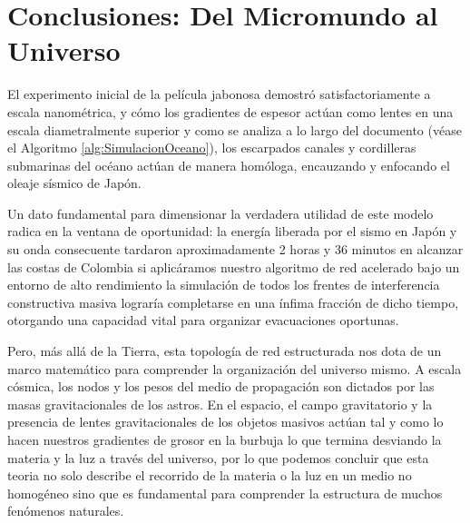 \section{Conclusiones: Del Micromundo al Universo}
El experimento inicial de la película jabonosa demostró satisfactoriamente a escala nanométrica, y cómo los gradientes de espesor actúan como lentes en una escala diametralmente superior y como se analiza a lo largo del documento (véase el Algoritmo \ref{alg:SimulacionOceano}), los escarpados canales y cordilleras submarinas del océano actúan de manera homóloga, encauzando y enfocando el oleaje sísmico de Japón. 

Un dato fundamental para dimensionar la verdadera utilidad de este modelo radica en la ventana de oportunidad: la energía liberada por el sismo en Japón y su onda consecuente tardaron aproximadamente 2 horas y 36 minutos en alcanzar las costas de Colombia si aplicáramos nuestro algoritmo de red acelerado bajo un entorno de alto rendimiento la simulación de todos los frentes de interferencia constructiva masiva lograría completarse en una ínfima fracción de dicho tiempo, otorgando una capacidad vital para organizar evacuaciones oportunas.

Pero, más allá de la Tierra, esta topología de red estructurada nos dota de un marco matemático para comprender la organización del universo mismo. A escala cósmica, los nodos y los pesos del medio de propagación son dictados por las masas gravitacionales de los astros. En el espacio, el campo gravitatorio y la presencia de lentes gravitacionales de los objetos masivos actúan tal y como lo hacen nuestros gradientes de grosor en la burbuja lo que termina desviando la materia y la luz a través del universo, por lo que podemos concluir que esta teoria no solo describe el recorrido de la materia o la luz en un medio no homogéneo sino que es fundamental para comprender la estructura de muchos fenómenos naturales.